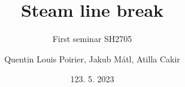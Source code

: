 

\title[APROS simulations of BWR transients]{Steam line break}
\subtitle{First seminar SH2705}
\author{Quentin Louis Poirier, Jakub Mátl, Atilla Cakir}
\date[24/05/23]{123. 5. 2023}
\usepackage{comment}

\usepackage[style=authoryear-ibid,backend=biber]{biblatex}
\usepackage{pgfplots}
\pgfplotsset{compat=1.18}



\nologo %




\frame{\titlepage}


